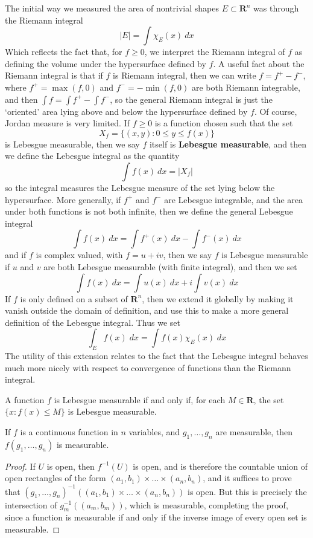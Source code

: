 The initial way we measured the area of nontrivial shapes $E \subset \mathbf{R}^n$ was through the Riemann integral
%
\[ |E| = \int \chi_E(x)\ dx \]
%
Which reflects the fact that, for $f \geq 0$, we interpret the Riemann integral of $f$ as defining the volume under the hypersurface defined by $f$. A useful fact about the Riemann integral is that if $f$ is Riemann integral, then we can write $f = f^+ - f^-$, where $f^+ = \max(f,0)$ and $f^- = -\min(f,0)$ are both Riemann integrable, and then $\int f = \int f^+ - \int f^-$, so the general Riemann integral is just the `oriented' area lying above and below the hypersurface defined by $f$. Of course, Jordan measure is very limited. If $f \geq 0$ is a function chosen such that the set
%
\[ X_f =  \{ (x,y): 0 \leq y \leq f(x) \} \]
%
is Lebesgue measurable, then we say $f$ itself is {\bf Lebesgue measurable}, and then we define the Lebesgue integral as the quantity
%
\[ \int f(x)\ dx = |X_f| \]
%
so the integral measures the Lebesgue measure of the set lying below the hypersurface. More generally, if $f^+$ and $f^-$ are Lebesgue integrable, and the area under both functions is not both infinite, then we define the general Lebesgue integral
%
\[ \int f(x)\ dx = \int f^+(x)\ dx - \int f^-(x)\ dx \]
%
and if $f$ is complex valued, with $f = u + iv$, then we say $f$ is Lebesgue measurable if $u$ and $v$ are both Lebesgue measurable (with finite integral), and then we set
%
\[ \int f(x)\ dx = \int u(x)\ dx + i \int v(x)\ dx \]
%
If $f$ is only defined on a subset of $\mathbf{R}^n$, then we extend it globally by making it vanish outside the domain of definition, and use this to make a more general definition of the Lebesgue integral. Thus we set
%
\[ \int_E f(x)\; dx = \int f(x) \chi_E(x)\; dx \]
%
The utility of this extension relates to the fact that the Lebesgue integral behaves much more nicely with respect to convergence of functions than the Riemann integral.

\begin{theorem}
  A function $f$ is Lebesgue measurable if and only if, for each $M \in \mathbf{R}$, the set $\{ x: f(x) \leq M \}$ is Lebesgue measurable.
\end{theorem}

\begin{lemma}
  If $f$ is a continuous function in $n$ variables, and $g_1, \dots, g_n$ are measurable, then $f(g_1, \dots, g_n)$ is measurable.
\end{lemma}
\begin{proof}
  If $U$ is open, then $f^{-1}(U)$ is open, and is therefore the countable union of open rectangles of the form $(a_1,b_1) \times \dots \times (a_n,b_n)$, and it suffices to prove that $(g_1, \dots, g_n)^{-1}((a_1,b_1) \times \dots \times (a_n,b_n))$ is open. But this is precisely the intersection of $g_m^{-1}((a_m,b_m))$, which is measurable, completing the proof, since a function is measurable if and only if the inverse image of every open set is measurable.
\end{proof}

